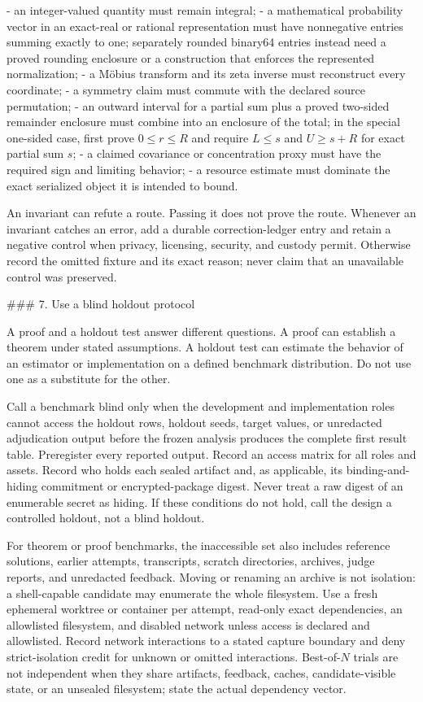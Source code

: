 \documentclass[11pt]{article}
\begin{document}
\begin{markdown}
- an integer-valued quantity must remain integral;
- a mathematical probability vector in an exact-real or rational representation must have
  nonnegative entries summing exactly to one; separately rounded binary64 entries instead need
  a proved rounding enclosure or a construction that enforces the represented normalization;
- a Möbius transform and its zeta inverse must reconstruct every coordinate;
- a symmetry claim must commute with the declared source permutation;
- an outward interval for a partial sum plus a proved two-sided remainder enclosure must combine
  into an enclosure of the total; in the special one-sided case, first prove
  $0\leq r\leq R$ and require $L\leq s$ and $U\geq s+R$ for exact partial sum $s$;
- a claimed covariance or concentration proxy must have the required sign and limiting behavior;
- a resource estimate must dominate the exact serialized object it is intended to bound.

An invariant can refute a route. Passing it does not prove the route. Whenever an invariant catches
an error, add a durable correction-ledger entry and retain a negative control when privacy,
licensing, security, and custody permit. Otherwise record the omitted fixture and its exact reason;
never claim that an unavailable control was preserved.

### 7. Use a blind holdout protocol

A proof and a holdout test answer different questions. A proof can establish a theorem under stated
assumptions. A holdout test can estimate the behavior of an estimator or implementation on a
defined benchmark distribution. Do not use one as a substitute for the other.

Call a benchmark blind only when the development and implementation roles cannot access the
holdout rows, holdout seeds, target values, or unredacted adjudication output before the frozen
analysis produces the complete first result table. Preregister every reported output. Record an
access matrix for all roles and assets. Record who holds each sealed artifact and, as applicable,
its binding-and-hiding commitment or encrypted-package digest. Never treat a raw digest of an
enumerable secret as hiding. If these conditions do not hold, call the design a controlled holdout,
not a blind holdout.

For theorem or proof benchmarks, the inaccessible set also includes reference solutions, earlier
attempts, transcripts, scratch directories, archives, judge reports, and unredacted feedback.
Moving or renaming an archive is not isolation: a shell-capable candidate may enumerate the whole
filesystem. Use a fresh ephemeral worktree or container per attempt, read-only exact dependencies,
an allowlisted filesystem, and disabled network unless access is declared and allowlisted. Record
network interactions to a stated capture boundary and deny strict-isolation credit for unknown or
omitted interactions. Best-of-$N$ trials are not independent when they share artifacts, feedback,
caches, candidate-visible state, or an unsealed filesystem; state the actual dependency vector.


\end{markdown}
\end{document}
